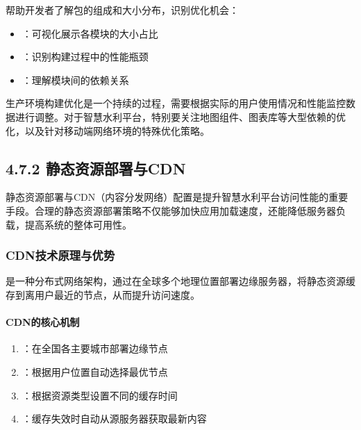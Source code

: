 帮助开发者了解包的组成和大小分布，识别优化机会：

\begin{itemize}
\tightlist
\item
  ：可视化展示各模块的大小占比
\item
  ：识别构建过程中的性能瓶颈
\item
  ：理解模块间的依赖关系
\end{itemize}

 生产环境构建优化是一个持续的过程，需要根据实际的用户使用情况和性能监控数据进行调整。对于智慧水利平台，特别要关注地图组件、图表库等大型依赖的优化，以及针对移动端网络环境的特殊优化策略。

\hypertarget{ux9759ux6001ux8d44ux6e90ux90e8ux7f72ux4e0ecdn}{%
\subsection{4.7.2 静态资源部署与CDN}\label{ux9759ux6001ux8d44ux6e90ux90e8ux7f72ux4e0ecdn}}

静态资源部署与CDN（内容分发网络）配置是提升智慧水利平台访问性能的重要手段。合理的静态资源部署策略不仅能够加快应用加载速度，还能降低服务器负载，提高系统的整体可用性。

\hypertarget{cdnux6280ux672fux539fux7406ux4e0eux4f18ux52bf}{%
\subsubsection{CDN技术原理与优势}\label{cdnux6280ux672fux539fux7406ux4e0eux4f18ux52bf}}

是一种分布式网络架构，通过在全球多个地理位置部署边缘服务器，将静态资源缓存到离用户最近的节点，从而提升访问速度。

\hypertarget{cdnux7684ux6838ux5fc3ux673aux5236}{%
\paragraph{CDN的核心机制}\label{cdnux7684ux6838ux5fc3ux673aux5236}}

\begin{enumerate}
\def\labelenumi{\arabic{enumi}.}
\tightlist
\item
  ：在全国各主要城市部署边缘节点
\item
  ：根据用户位置自动选择最优节点
\item
  ：根据资源类型设置不同的缓存时间
\item
  ：缓存失效时自动从源服务器获取最新内容
\end{enumerate}

